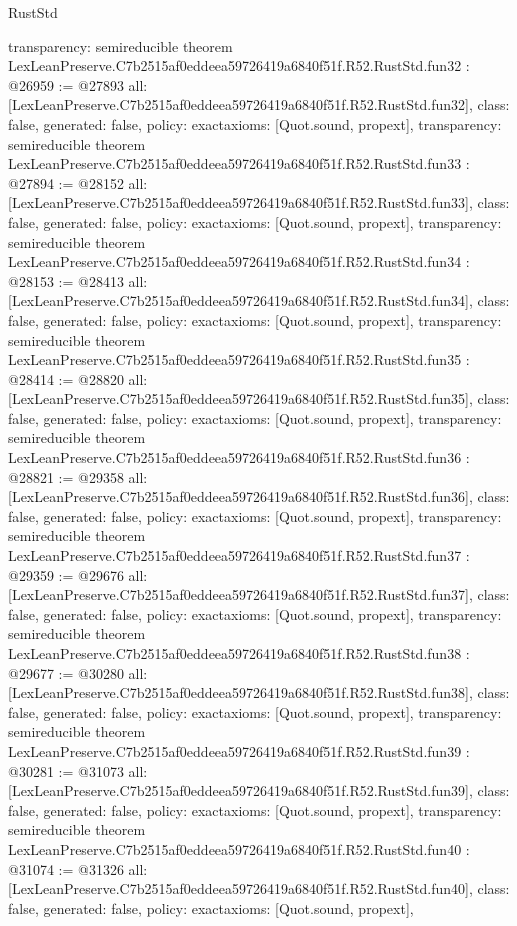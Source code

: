 \begin{lexlean}{RustStd}
\begin{coremodule}
{  transparency: semireducible
}
theorem LexLeanPreserve.C7b2515af0eddeea59726419a6840f51f.R52.RustStd.fun32 : @26959 := @27893 {
  all: [LexLeanPreserve.C7b2515af0eddeea59726419a6840f51f.R52.RustStd.fun32],
  class: false,
  generated: false,
  policy: exact{axioms: [Quot.sound, propext]},
  transparency: semireducible
}
theorem LexLeanPreserve.C7b2515af0eddeea59726419a6840f51f.R52.RustStd.fun33 : @27894 := @28152 {
  all: [LexLeanPreserve.C7b2515af0eddeea59726419a6840f51f.R52.RustStd.fun33],
  class: false,
  generated: false,
  policy: exact{axioms: [Quot.sound, propext]},
  transparency: semireducible
}
theorem LexLeanPreserve.C7b2515af0eddeea59726419a6840f51f.R52.RustStd.fun34 : @28153 := @28413 {
  all: [LexLeanPreserve.C7b2515af0eddeea59726419a6840f51f.R52.RustStd.fun34],
  class: false,
  generated: false,
  policy: exact{axioms: [Quot.sound, propext]},
  transparency: semireducible
}
theorem LexLeanPreserve.C7b2515af0eddeea59726419a6840f51f.R52.RustStd.fun35 : @28414 := @28820 {
  all: [LexLeanPreserve.C7b2515af0eddeea59726419a6840f51f.R52.RustStd.fun35],
  class: false,
  generated: false,
  policy: exact{axioms: [Quot.sound, propext]},
  transparency: semireducible
}
theorem LexLeanPreserve.C7b2515af0eddeea59726419a6840f51f.R52.RustStd.fun36 : @28821 := @29358 {
  all: [LexLeanPreserve.C7b2515af0eddeea59726419a6840f51f.R52.RustStd.fun36],
  class: false,
  generated: false,
  policy: exact{axioms: [Quot.sound, propext]},
  transparency: semireducible
}
theorem LexLeanPreserve.C7b2515af0eddeea59726419a6840f51f.R52.RustStd.fun37 : @29359 := @29676 {
  all: [LexLeanPreserve.C7b2515af0eddeea59726419a6840f51f.R52.RustStd.fun37],
  class: false,
  generated: false,
  policy: exact{axioms: [Quot.sound, propext]},
  transparency: semireducible
}
theorem LexLeanPreserve.C7b2515af0eddeea59726419a6840f51f.R52.RustStd.fun38 : @29677 := @30280 {
  all: [LexLeanPreserve.C7b2515af0eddeea59726419a6840f51f.R52.RustStd.fun38],
  class: false,
  generated: false,
  policy: exact{axioms: [Quot.sound, propext]},
  transparency: semireducible
}
theorem LexLeanPreserve.C7b2515af0eddeea59726419a6840f51f.R52.RustStd.fun39 : @30281 := @31073 {
  all: [LexLeanPreserve.C7b2515af0eddeea59726419a6840f51f.R52.RustStd.fun39],
  class: false,
  generated: false,
  policy: exact{axioms: [Quot.sound, propext]},
  transparency: semireducible
}
theorem LexLeanPreserve.C7b2515af0eddeea59726419a6840f51f.R52.RustStd.fun40 : @31074 := @31326 {
  all: [LexLeanPreserve.C7b2515af0eddeea59726419a6840f51f.R52.RustStd.fun40],
  class: false,
  generated: false,
  policy: exact{axioms: [Quot.sound, propext]},
}
\end{coremodule}
\end{lexlean}
